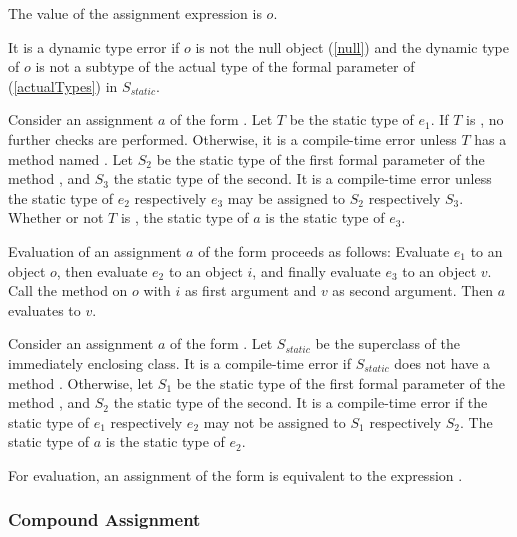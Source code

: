 \documentclass[makeidx]{article}
\begin{document}
{

\LMHash{}%
The value of the assignment expression is $o$.

\LMHash{}%
It is a dynamic type error if $o$ is not the null object (\ref{null})
and the dynamic type of $o$ is
not a subtype of the actual type of the formal parameter of 
(\ref{actualTypes}) in $S_{static}$.
\EndCase

\LMHash{}%
Consider an assignment $a$ of the form .
Let $T$ be the static type of $e_1$.
If $T$ is \DYNAMIC{}, no further checks are performed.
Otherwise, it is a compile-time error unless
$T$ has a method named \code{[]=}.
Let $S_2$ be the static type of the
first formal parameter of the method \code{[]=},
and $S_3$ the static type of the second.
It is a compile-time error unless the static type of $e_2$ respectively $e_3$
may be assigned to $S_2$ respectively $S_3$.
Whether or not $T$ is \DYNAMIC{},
the static type of $a$ is the static type of $e_3$.

\LMHash{}%
Evaluation of an assignment $a$ of the form 
proceeds as follows:
Evaluate $e_1$ to an object $o$,
then evaluate $e_2$ to an object $i$,
and finally evaluate $e_3$ to an object $v$.
Call the method \code{[]=} on $o$
with $i$ as first argument and $v$ as second argument.
Then $a$ evaluates to $v$.
\EndCase

\LMHash{}%
Consider an assignment $a$ of the form .
Let $S_{static}$ be the superclass of the immediately enclosing class.
It is a compile-time error if $S_{static}$ does not have a method \code{[]=}.
Otherwise, let $S_1$ be the static type of the
first formal parameter of the method \code{[]=},
and $S_2$ the static type of the second.
It is a compile-time error if the static type of $e_1$ respectively $e_2$
may not be assigned to $S_1$ respectively $S_2$.
The static type of $a$ is the static type of $e_2$.

\LMHash{}%
For evaluation, an assignment of the form 
is equivalent to the expression .
\EndCase


\subsubsection{Compound Assignment}

}
\end{document}

